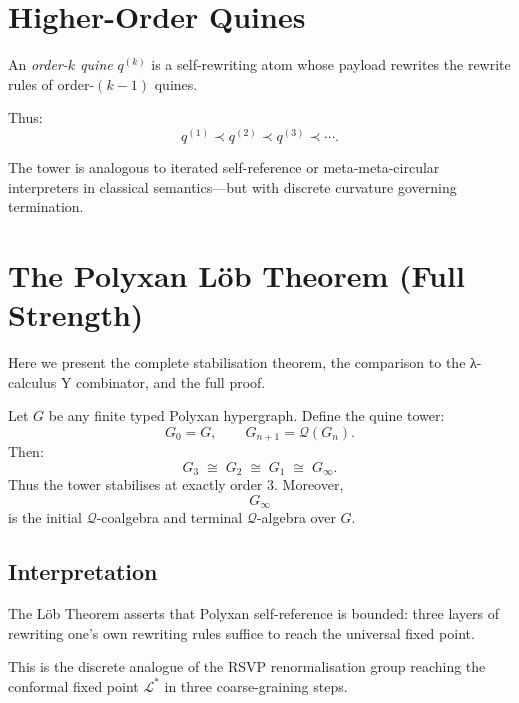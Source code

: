 \section{Higher-Order Quines}

\begin{definition}
An \emph{order-$k$ quine} $q^{(k)}$ is a self-rewriting atom whose payload 
rewrites the rewrite rules of order-$(k-1)$ quines.
\end{definition}

Thus:
\[
q^{(1)} \prec q^{(2)} \prec q^{(3)} \prec\cdots.
\]

The tower is analogous to iterated self-reference or 
meta-meta-circular interpreters in classical semantics—but with discrete curvature governing termination.

\section{The Polyxan Löb Theorem (Full Strength)}

Here we present the complete stabilisation theorem, the comparison to the 
λ-calculus Y combinator, and the full proof.

\begin{theorem}
\label{thm:polyx-loeb}
Let $G$ be any finite typed Polyxan hypergraph.  
Define the quine tower:
\[
G_0 = G,\qquad G_{n+1} = \mathcal{Q}(G_n).
\]
Then:
\[
G_3 \;\cong\; G_2 \;\cong\; G_1 \;\cong\; G_\infty.
\]
Thus the tower stabilises at exactly order $3$.  
Moreover,
\[
G_\infty
\]
is the initial $\mathcal{Q}$-coalgebra and terminal $\mathcal{Q}$-algebra over $G$.
\end{theorem}

\subsection*{Interpretation}

The Löb Theorem asserts that Polyxan self-reference is bounded:  
three layers of rewriting one’s own rewriting rules suffice to reach the universal fixed point.

This is the discrete analogue of the RSVP renormalisation group reaching  
the conformal fixed point $\mathcal{L}^{\ast}$ in three coarse-graining steps.

